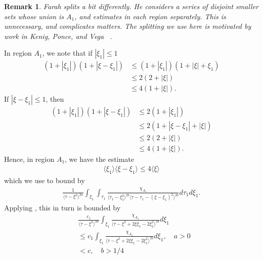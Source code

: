 \documentclass[12pt,reqno]{amsart}
\numberwithin{equation}{section}  %
\renewcommand{\cref}{\Cref}
\newtheorem{remark}[theorem]{Remark}
\begin{document}
%
%
\begin{framed}
\begin{remark}
Farah splits a bit differently. He considers a series of disjoint smaller sets
whose union is $A_{1}$, and estimates in each region separately.  This is
unnecessary, and complicates matters. The splitting we use here is motivated by
work in Kenig, Ponce, and Vega~\cite{Kenig:1996aa}
\label{rem:farah-dif-splitting-organization}.
\end{remark}
\end{framed}
%
In region $A_{1}$, we note that if $| \xi_{1} | \le 1$
%
%
%
%
\begin{equation*}
\begin{split}
  (1 + | \xi_{1} |)(1 + | \xi - \xi_{1} |)
  & \le (1 + | \xi_{1} |)(1 + | \xi | + \xi_{1})
  \\
  & \le 2 (2 + | \xi |)
  \\
  & \le 4 (1 + | \xi |).
\end{split}
\end{equation*}
%
%
If $| \xi - \xi_{1} |\le 1$, then
%
%
\begin{equation*}
\begin{split}
  (1 + | \xi_{1} |)(1 + | \xi - \xi_{1} |)
  & \le 2 (1 + | \xi_{1} |)
  \\
  & \le 2 (1 + | \xi - \xi_{1} | + | \xi |)
  \\
  & \le 2(2 + | \xi |)
  \\
  & \le 4 (1 + | \xi |).
\end{split}
\end{equation*}
%
%
Hence, in region $A_{1}$, we have the estimate
%
%
\begin{equation}
\begin{split}
  \langle \xi_{1} \rangle \langle \xi - \xi_{1} \rangle  \le 4 \langle \xi \rangle 
\end{split}
\label{splitting-estimate}
\end{equation}
%
%
which we use to bound \cref{case-1-region-1} by
%
%
%
%
\begin{equation*}
\begin{split}
    \frac{1}{\langle \tau - \xi^{2} \rangle ^{2a}}
    \int_{\xi_{1}} \int_{\tau_{1}} \frac{\chi_{A_{1}}}{\langle \tau_{1} -
    \xi_{1}^{2} \rangle^{2b} \langle  \tau - \tau_{1} - (\xi - \xi_{1})^{2}
    \rangle^{2b}} d \tau_1 d \xi_{1}.
\end{split}
\end{equation*}
%
%
Applying \cref{lem:calc}, this in turn is bounded by
%
%
\begin{equation}
  \label{uniform-bound-region-1}
\begin{split}
  & \frac{c_{1}}{\langle \tau - \xi^{2} \rangle^{2a}} \int_{\xi_{1}}
  \frac{\chi_{A_{1}}}{\langle \tau - \xi^{2} + 2 \xi \xi_{1} - 2
  \xi_{1}^{2} \rangle^{2b}} d \xi_{1}
  \\
  & \le c_{1} \int_{\xi_{1}}
  \frac{\chi_{A_{1}}}{\langle \tau - \xi^{2} + 2 \xi \xi_{1} - 2
  \xi_{1}^{2} \rangle^{2b}} d \xi_{1}, \quad a > 0
  \\
& < c, \quad b > 1/4
\end{split}
\end{equation}
\end{document}
